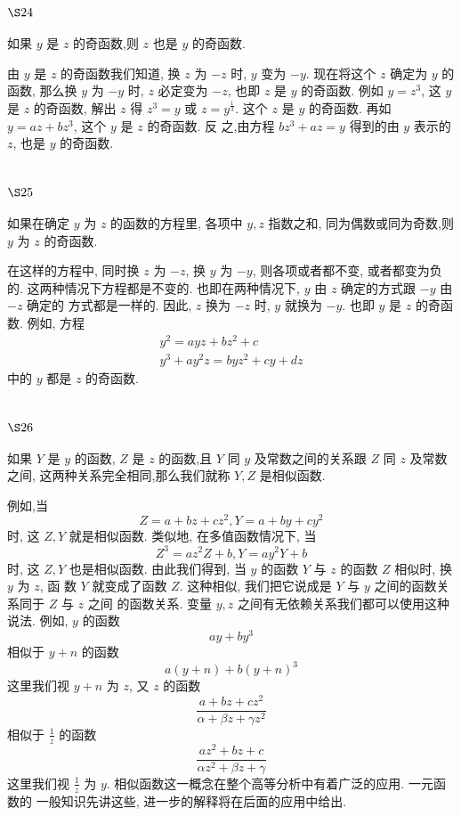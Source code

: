 \section{$\S 24$}

如果 $y$ 是 $z$ 的奇函数,则 $z$ 也是 $y$ 的奇函数.

由 $y$ 是 $z$ 的奇函数我们知道, 换 $z$ 为 $-z$ 时, $y$ 变为 $-y$. 现在将这个 $z$ 确定为 $y$ 的函数, 那么换 $y$ 为 $-y$ 时, $z$ 必定变为 $-z$, 也即 $z$ 是 $y$ 的奇函数. 例如 $y=z^{3}$, 这 $y$ 是 $z$ 的奇函数, 解出 $z$ 得 $z^{3}=y$ 或 $z=y^{\frac{1}{3}}$. 这个 $z$ 是 $y$ 的奇函数. 再如 $y=a z+b z^{3}$, 这个 $y$ 是 $z$ 的奇函数. 反 之,由方程 $b z^{3}+a z=y$ 得到的由 $y$ 表示的 $z$, 也是 $y$ 的奇函数.

\section{$\S 25$}

如果在确定 $y$ 为 $z$ 的函数的方程里, 各项中 $y, z$ 指数之和, 同为偶数或同为奇数,则 $y$ 为 $z$ 的奇函数.

在这样的方程中, 同时换 $z$ 为 $-z$, 换 $y$ 为 $-y$, 则各项或者都不变, 或者都变为负的. 这两种情况下方程都是不变的. 也即在两种情况下, $y$ 由 $z$ 确定的方式跟 $-y$ 由 $-z$ 确定的 方式都是一样的. 因此, $z$ 换为 $-z$ 时, $y$ 就换为 $-y$. 也即 $y$ 是 $z$ 的奇函数. 例如, 方程
\[
\begin{gathered}
y^{2}=a y z+b z^{2}+c \\
y^{3}+a y^{2} z=b y z^{2}+c y+d z
\end{gathered}
\]
中的 $y$ 都是 $z$ 的奇函数.

\section{$\S 26$}

如果 $Y$ 是 $y$ 的函数, $Z$ 是 $z$ 的函数,且 $Y$ 同 $y$ 及常数之间的关系跟 $Z$ 同 $z$ 及常数之间, 这两种关系完全相同,那么我们就称 $Y, Z$ 是相似函数.

例如,当
\[
Z=a+b z+c z^{2}, Y=a+b y+c y^{2}
\]
时, 这 $Z, Y$ 就是相似函数. 类似地, 在多值函数情况下, 当
\[
Z^{3}=a z^{2} Z+b, Y=a y^{2} Y+b
\]
时, 这 $Z, Y$ 也是相似函数. 由此我们得到, 当 $y$ 的函数 $Y$ 与 $z$ 的函数 $Z$ 相似时, 换 $y$ 为 $z$, 函 数 $Y$ 就变成了函数 $Z$. 这种相似, 我们把它说成是 $Y$ 与 $y$ 之间的函数关系同于 $Z$ 与 $z$ 之间 的函数关系. 变量 $y, z$ 之间有无依赖关系我们都可以使用这种说法. 例如, $y$ 的函数
\[
a y+b y^{3}
\]
相似于 $y+n$ 的函数
\[
a(y+n)+b(y+n)^{3}
\]
这里我们视 $y+n$ 为 $z$, 又 $z$ 的函数
\[
\frac{a+b z+c z^{2}}{\alpha+\beta z+\gamma z^{2}}
\]
相似于 $\frac{1}{z}$ 的函数
\[
\frac{a z^{2}+b z+c}{\alpha z^{2}+\beta z+\gamma}
\]
这里我们视 $\frac{1}{z}$ 为 $y$. 相似函数这一概念在整个高等分析中有着广泛的应用. 一元函数的 一般知识先讲这些, 进一步的解释将在后面的应用中给出. 

